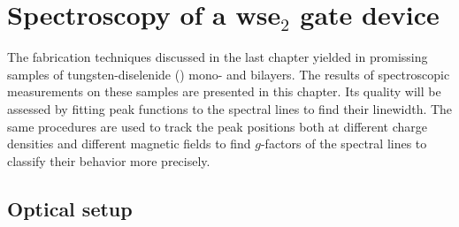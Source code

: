 \chapter{Spectroscopy of  a ws\textup{e}$_2$ gate device}\label{spectroscopy}

The fabrication techniques discussed in the last chapter yielded in promissing samples of tungsten-diselenide (\wse\!) mono- and bilayers. The results of spectroscopic measurements on these samples are presented in this chapter. Its quality will be assessed by fitting peak functions to the spectral lines to find their linewidth. The same procedures are used to track the peak positions both at different charge densities and different magnetic fields to find $g$-factors of the spectral lines to classify their behavior more precisely.

\section{Optical setup}\label{opticalsetup}

